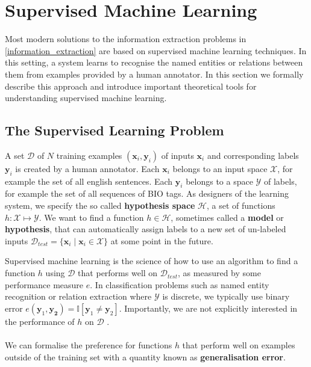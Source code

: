\section{Supervised Machine Learning}
\label{supervised_machine_learning}

Most modern solutions to the information extraction problems in \ref{information_extraction} are based on supervised machine learning techniques. In this setting, a system learns to recognise the named entities or relations between them from examples provided by a human annotator. In this section we formally describe this approach and introduce important theoretical tools for understanding supervised machine learning.

\subsection{The Supervised Learning Problem}
\label{the_supervised_learning_problem}
A set $\mathcal{D}$ of $N$ training examples $(\mathbf{x}_i, \mathbf{y}_i)$ of inputs $\mathbf{x}_i$ and corresponding labels $\mathbf{y}_i$ is created by a human annotator. Each $\mathbf{x}_i$ belongs to an input space $\mathcal{X}$, for example the set of all english sentences. Each $\mathbf{y}_i$ belongs to a space $\mathcal{Y}$ of labels, for example the set of all sequences of BIO tags. As designers of the learning system, we specify the so called \textbf{hypothesis space} $\mathcal{H}$, a set of functions $h: \mathcal{X} \mapsto \mathcal{Y}$. We want to find a function $h \in \mathcal{H}$, sometimes called a \textbf{model} or \textbf{hypothesis}, that can automatically assign labels to a new set of un-labeled inputs $\mathcal{D}_{test} = \{ \mathbf{x}_i \mid \mathbf{x}_i \in \mathcal{X}\}$ at some point in the future. 

Supervised machine learning is the science of how to use an algorithm to find a function $h$ using $\mathcal{D}$ that performs well on $\mathcal{D}_{test}$, as measured by some performance measure $e$. In classification problems such as named entity recognition or relation extraction where $\mathcal{Y}$ is discrete, we typically use binary error $e(\mathbf{y}_1, \mathbf{y_2}) = \mathbb{I}[\mathbf{y}_1 \neq \mathbf{y}_2]$. Importantly, we are not explicitly interested in the performance of $h$ on $\mathcal{D}$ \citep{yaser12}.
\\\\
We can formalise the preference for functions $h$ that perform well on examples outside of the training set with a quantity known as \textbf{generalisation error}.

